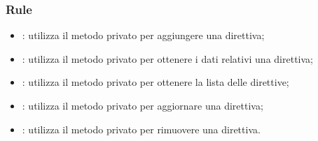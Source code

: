\subsubsection{Rule}
\begin{itemize}
\item {}: utilizza il metodo privato  per aggiungere una direttiva;

\item {}: utilizza il metodo privato  per ottenere i dati relativi una direttiva;

\item {}: utilizza il metodo privato  per ottenere la lista delle direttive;

\item {}: utilizza il metodo privato  per aggiornare una direttiva;

\item {}: utilizza il metodo privato  per rimuovere una direttiva.


\end{itemize}
